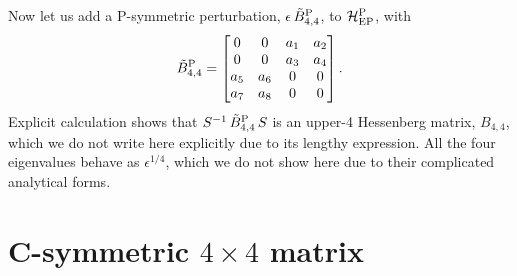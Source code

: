 \documentclass[aps, prb, onecolumn, nofootinbib, citeautoscript, 10pt]{revtex4-2}
\begin{document}
Now let us add a P-symmetric perturbation, $\epsilon\, \tilde B^{\rm P}_{4,4}$, to ${\mathcal H^{\rm P}_{\rm EP}}$, with
\begin{align}
\tilde B^{\rm P}_{4,4} = \begin{bmatrix}
0 & 0 & a_1 & a_2 \\
 0 & 0 & a_3 & a_4 \\
 a_5 & a_6 & 0 & 0 \\
 a_7 & a_8 & 0 & 0 \\
\end{bmatrix}.
\end{align}
Explicit calculation shows that $S^{-1}\, \tilde B^{\rm P}_{4,4}\, S $ is an upper-4 Hessenberg matrix, $ B_{4,4}$, which we do not write here explicitly due to its lengthy expression. All the four eigenvalues behave as $ \epsilon^{1/4} $, which we do not show here due to their complicated analytical forms.


\section{C-symmetric $4 \times 4$ matrix}
\label{app2}
\end{document}
